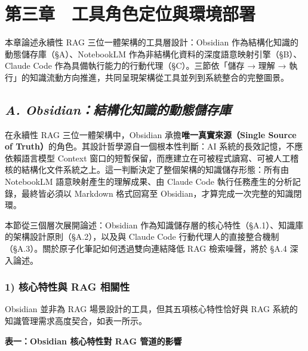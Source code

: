 \chapter{第三章　工具角色定位與環境部署}\label{ux7b2cux4e09ux7ae0-ux5de5ux5177ux89d2ux8272ux5b9aux4f4dux8207ux74b0ux5883ux90e8ux7f72}

本章論述永續性 RAG 三位一體架構的工具層設計：Obsidian
作為結構化知識的動態儲存庫（§A）、NotebookLM
作為非結構化資料的深度語意映射引擎（§B）、Claude Code
作為具備執行能力的行動代理（§C）。三節依「儲存 → 理解 →
執行」的知識流動方向推進，共同呈現架構從工具並列到系統整合的完整圖景。

\section{\texorpdfstring{\emph{A.
Obsidian：結構化知識的動態儲存庫}}{A. Obsidian：結構化知識的動態儲存庫}}\label{a.-obsidianux7d50ux69cbux5316ux77e5ux8b58ux7684ux52d5ux614bux5132ux5b58ux5eab}

在永續性 RAG 三位一體架構中，Obsidian 承擔\textbf{唯一真實來源（Single
Source of Truth）}的角色。其設計哲學源自一個根本性判斷：AI
系統的長效記憶，不應依賴語言模型 Context
窗口的短暫保留，而應建立在可被程式讀寫、可被人工稽核的結構化文件系統之上。這一判斷決定了整個架構的知識儲存形態：所有由
NotebookLM 語意映射產生的理解成果、由 Claude Code
執行任務產生的分析記錄，最終皆必須以 Markdown 格式回寫至
Obsidian，才算完成一次完整的知識閉環。

本節從三個層次展開論述：Obsidian
作為知識儲存層的核心特性（§A.1）、知識庫的架構設計原則（§A.2），以及與
Claude Code
行動代理人的直接整合機制（§A.3）。關於原子化筆記如何透過雙向連結降低 RAG
檢索噪聲，將於 §A.4 深入論述。

\subsection{1) 核心特性與 RAG
相關性}\label{ux6838ux5fc3ux7279ux6027ux8207-rag-ux76f8ux95dcux6027}

Obsidian 並非為 RAG 場景設計的工具，但其五項核心特性恰好與 RAG
系統的知識管理需求高度契合，如表一所示。

\textbf{表一：Obsidian 核心特性對 RAG 管道的影響}

